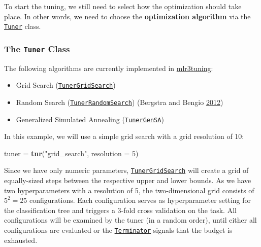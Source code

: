 \documentclass[]{article}
\newenvironment{Shaded}{\begin{snugshade}}{\end{snugshade}}
\newcommand{\DataTypeTok}[1]{\textcolor[rgb]{0.13,0.29,0.53}{#1}}
\newcommand{\DecValTok}[1]{\textcolor[rgb]{0.00,0.00,0.81}{#1}}
\newcommand{\KeywordTok}[1]{\textcolor[rgb]{0.13,0.29,0.53}{\textbf{#1}}}
\newcommand{\NormalTok}[1]{#1}
\newcommand{\StringTok}[1]{\textcolor[rgb]{0.31,0.60,0.02}{#1}}
\providecommand{\tightlist}{%
  \setlength{\itemsep}{0pt}\setlength{\parskip}{0pt}}
\renewenvironment{Shaded} {\begin{snugshade}\small} {\end{snugshade}}
\begin{document}
To start the tuning, we still need to select how the optimization should take place.
In other words, we need to choose the \textbf{optimization algorithm} via the \href{https://mlr3tuning.mlr-org.com/reference/Tuner.html}{\texttt{Tuner}} class.

\hypertarget{the-tuner-class}{%
\subsubsection{\texorpdfstring{The \texttt{Tuner} Class}{The Tuner Class}}\label{the-tuner-class}}

The following algorithms are currently implemented in \href{https://mlr3tuning.mlr-org.com}{mlr3tuning}:

\begin{itemize}
\tightlist
\item
  Grid Search (\href{https://mlr3tuning.mlr-org.com/reference/mlr_tuners_grid_search.html}{\texttt{TunerGridSearch}})
\item
  Random Search (\href{https://mlr3tuning.mlr-org.com/reference/mlr_tuners_random_search.html}{\texttt{TunerRandomSearch}}) (Bergstra and Bengio \protect\hyperlink{ref-bergstra2012}{2012})
\item
  Generalized Simulated Annealing (\href{https://mlr3tuning.mlr-org.com/reference/mlr_tuners_gensa.html}{\texttt{TunerGenSA}})
\end{itemize}

In this example, we will use a simple grid search with a grid resolution of 10:

\begin{Shaded}
\begin{Highlighting}[]
\NormalTok{tuner =}\StringTok{ }\KeywordTok{tnr}\NormalTok{(}\StringTok{"grid_search"}\NormalTok{, }\DataTypeTok{resolution =} \DecValTok{5}\NormalTok{)}
\end{Highlighting}
\end{Shaded}

Since we have only numeric parameters, \href{https://mlr3tuning.mlr-org.com/reference/mlr_tuners_grid_search.html}{\texttt{TunerGridSearch}} will create a grid of equally-sized steps between the respective upper and lower bounds.
As we have two hyperparameters with a resolution of 5, the two-dimensional grid consists of \(5^2 = 25\) configurations.
Each configuration serves as hyperparameter setting for the classification tree and triggers a 3-fold cross validation on the task.
All configurations will be examined by the tuner (in a random order), until either all configurations are evaluated or the \href{https://mlr3tuning.mlr-org.com/reference/Terminator.html}{\texttt{Terminator}} signals that the budget is exhausted.
\end{document}
